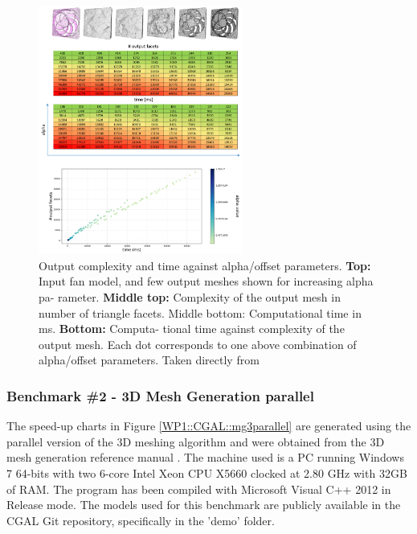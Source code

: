 \begin{figure}[htb]
    \centering
    \includegraphics[width=0.6\textwidth]{graphics/cgal/fan.png} 
    \caption{Output complexity and time against alpha/offset parameters.
\textbf{Top:} Input fan model, and few output meshes shown for increasing alpha pa-
rameter. \textbf{Middle top:} Complexity of the output mesh in number of triangle
facets. Middle bottom: Computational time in ms. \textbf{Bottom:} Computa-
tional time against complexity of the output mesh. Each dot corresponds to
one above combination of alpha/offset parameters. Taken directly from \cite{portaneri_alpha_2022}}
\label{WP1::CGAL::aw3}
\end{figure}



\subsubsection{Benchmark \#2 - 3D Mesh Generation parallel}


The speed-up charts in Figure \ref{WP1::CGAL::mg3parallel} are generated using the parallel version of the 3D meshing algorithm and were obtained 
from the 3D mesh generation reference manual \cite{alliez_3d_2024}. 
The machine used is a PC running Windows 7 64-bits with two 6-core Intel Xeon CPU X5660 clocked at 2.80 GHz with 32GB of RAM. 
The program has been compiled with Microsoft Visual C++ 2012 in Release mode.
The models used for this benchmark are publicly available in the CGAL Git repository, specifically in the 'demo' folder.


